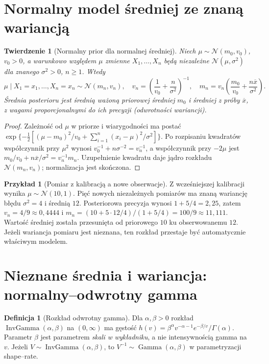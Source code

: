 \documentclass[11pt,a4paper,oneside]{report}
\numberwithin{equation}{chapter}
\theoremstyle{plain}
\newtheorem{twierdzenie}{Twierdzenie}[chapter]
\theoremstyle{definition}
\newtheorem{definicja}{Definicja}[chapter]
\newtheorem{przyklad}{Przykład}[chapter]
\theoremstyle{remark}
\begin{document}
\section{Normalny model średniej ze znaną wariancją}
\begin{twierdzenie}[Normalny prior dla normalnej średniej]
\label{thm:normal-normal}
Niech $\mu\sim\mathcal N(m_0,v_0)$, $v_0>0$, a warunkowo
względem $\mu$ zmienne $X_1,\ldots,X_n$ będą niezależne
$\mathcal N(\mu,\sigma^2)$ dla znanego $\sigma^2>0$, $n\ge1$.
Wtedy
\[
 \mu\mid X_1=x_1,\ldots,X_n=x_n\sim\mathcal N(m_n,v_n),
 \quad v_n=\left(\frac1{v_0}+\frac n{\sigma^2}\right)^{-1},
 \quad m_n=v_n\left(\frac{m_0}{v_0}+\frac{n\overline x}{\sigma^2}\right).
\]
Średnia posterioru jest średnią ważoną priorowej średniej
$m_0$ i średniej z próby $\overline x$, z wagami
proporcjonalnymi do ich precyzji (odwrotności wariancji).
\end{twierdzenie}
\begin{proof}
Zależność od $\mu$ w priorze i wiarygodności ma postać
$\exp\{-\tfrac12[(\mu-m_0)^2/v_0+
\sum_{i=1}^n(x_i-\mu)^2/\sigma^2]\}$.
Po rozpisaniu kwadratów współczynnik przy $\mu^2$
wynosi $v_0^{-1}+n\sigma^{-2}=v_n^{-1}$,
a współczynnik przy $-2\mu$ jest
$m_0/v_0+n\overline x/\sigma^2=v_n^{-1}m_n$.
Uzupełnienie kwadratu daje jądro rozkładu
$\mathcal N(m_n,v_n)$; normalizacja jest skończona.
\end{proof}

\begin{przyklad}[Pomiar z kalibracją a nowe obserwacje]
Z wcześniejszej kalibracji wynika $\mu\sim\mathcal N(10,1)$.
Pięć nowych niezależnych pomiarów ma znaną wariancję
błędu $\sigma^2=4$ i średnią $12$. Posteriorowa precyzja
wynosi $1+5/4=2{,}25$, zatem
$v_n=4/9\approx0{,}4444$ i
$m_n=(10+5\cdot12/4)/(1+5/4)=100/9\approx11{,}111$.
Wartość średniej została przesunięta od priorowego $10$ ku
obserwowanemu $12$. Jeżeli wariancja pomiaru jest nieznana,
ten rozkład przestaje być automatycznie właściwym modelem.
\end{przyklad}

\section{Nieznane średnia i wariancja: normalny--odwrotny gamma}
\begin{definicja}[Rozkład odwrotny gamma]
Dla $\alpha,\beta>0$ rozkład
$\operatorname{InvGamma}(\alpha,\beta)$ na $(0,\infty)$
ma gęstość
$h(v)=\beta^\alpha v^{-\alpha-1}e^{-\beta/v}/\Gamma(\alpha)$.
Parametr $\beta$ jest parametrem \emph{skali w wykładniku},
a nie intensywnością gamma na $v$. Jeżeli
$V\sim\operatorname{InvGamma}(\alpha,\beta)$,
to $V^{-1}\sim\operatorname{Gamma}(\alpha,\beta)$
w parametryzacji shape--rate.
\end{definicja}
\end{document}
